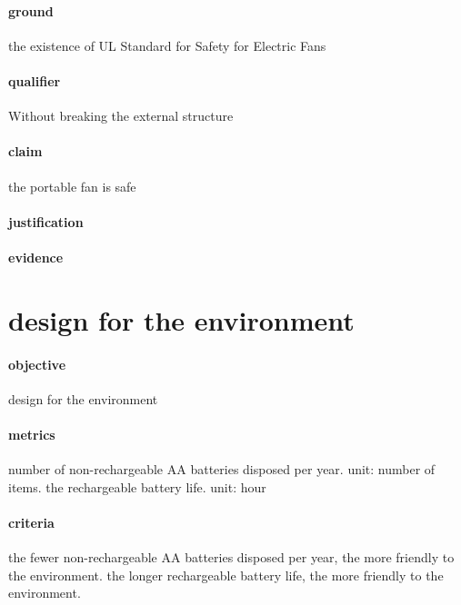 \documentclass[12pt]{article}
\begin{document}
\begin{itemize}
\paragraph{ground}

the existence of UL Standard for Safety for Electric Fans

\paragraph{qualifier}

Without breaking the external structure

\paragraph{claim}

the portable fan is safe

\paragraph{justification}



\paragraph{evidence}



\section{design for the environment}
\paragraph{objective}

 design for the environment
 
\paragraph{metrics} 

number of non-rechargeable AA batteries disposed per year. unit: number of items.
the rechargeable battery life. unit: hour

\paragraph{criteria}

the fewer non-rechargeable AA batteries disposed per year, the more friendly to the environment.
the longer rechargeable battery life, the more friendly to the environment.


\end{itemize}
\end{document}
